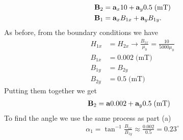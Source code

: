 \documentclass[../../header.tex]{subfiles}
\begin{document}
{\begin{enumerate}[label=(\alph*)]
\begin{align*}
\mathbf{B}_2 &= \mathbf{a}_x10+\mathbf{a}_y0.5\; \text{(mT)}\\
\mathbf{B}_1 &= \mathbf{a}_xB_{1x}+\mathbf{a}_yB_{1y}.
\end{align*}
As before, from the boundary conditions we have
\begin{align*}
H_{1x} &= H_{2x} \rightarrow \frac{B_{1x}}{\mu_0}=\frac{10}{5000\mu_0}\\
B_{1x} &= 0.002\; \text{(mT)}\\
B_{1y} &= B_{2y}\\
B_{2y} &= 0.5\; \text{(mT)}
\end{align*}
Putting them together we get
\begin{align*}
\mathbf{B}_2 &= \mathbf{a}0.002+\mathbf{a}_y0.5\; \text{(mT)}
\end{align*}
To find the angle we use the same process as part (a)
\begin{align*}
\alpha_1 = \tan^{-1} \frac{B_{1x}}{B_{1y}} \approx \frac{0.002}{0.5} = 0.23^\circ
\end{align*}

\end{enumerate}
}


\end{document}
